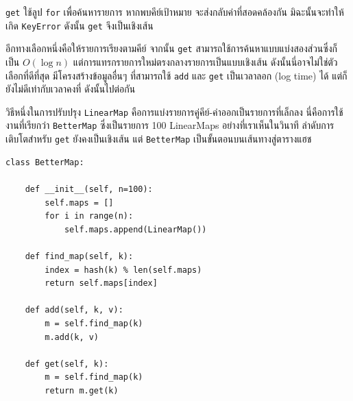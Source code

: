 {\tt get} ใช้ลูป {\tt for} เพื่อค้นหารายการ หากพบคีย์เป้าหมาย จะส่งกลับค่าที่สอดคล้องกัน 
มิฉะนั้นจะทำให้เกิด {\tt KeyError} ดังนั้น {\tt get} จึงเป็นเชิงเส้น

อีกทางเลือกหนึ่งคือให้รายการเรียงตามคีย์ จากนั้น {\tt get} สามารถใช้การค้นหาแบบแบ่งสองส่วนซึ่งก็เป็น $O(\log n)$ 
แต่การแทรกรายการใหม่ตรงกลางรายการเป็นแบบเชิงเส้น ดังนั้นนี่อาจไม่ใช่ตัวเลือกที่ดีที่สุด มีโครงสร้างข้อมูลอื่นๆ ที่สามารถใช้ {\tt   add} 
และ {\tt get} เป็นเวลาลอก (log time) ได้ แต่ก็ยังไม่ดีเท่ากับเวลาคงที่ ดังนั้นไปต่อกัน


วิธีหนึ่งในการปรับปรุง {\tt LinearMap} คือการแบ่งรายการคู่คีย์-ค่าออกเป็นรายการที่เล็กลง นี่คือการใช้งานที่เรียกว่า {\tt BetterMap} 
ซึ่งเป็นรายการ 100 LinearMaps อย่างที่เราเห็นในวินาที ลำดับการเติบโตสำหรับ {\tt get} ยังคงเป็นเชิงเส้น 
แต่ {\tt BetterMap} เป็นขั้นตอนบนเส้นทางสู่ตารางแฮช


\begin{verbatim}
class BetterMap:

    def __init__(self, n=100):
        self.maps = []
        for i in range(n):
            self.maps.append(LinearMap())

    def find_map(self, k):
        index = hash(k) % len(self.maps)
        return self.maps[index]

    def add(self, k, v):
        m = self.find_map(k)
        m.add(k, v)

    def get(self, k):
        m = self.find_map(k)
        return m.get(k)
\end{verbatim}

